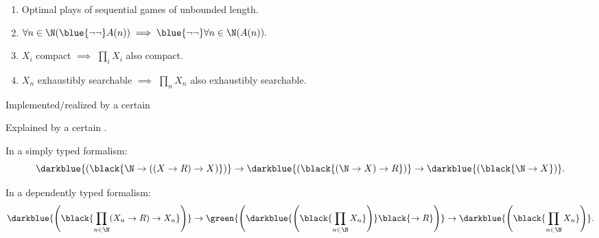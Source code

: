 \documentclass%
[%
Screen4to3,
]{foils}
\title{\darkblue{The ubiquitous selection monad}}
\author{\darkblue{Mart\'{\i}n Escard\'o} \\
University of Birmingham, UK\\[10ex]
Joint work with \darkblue{Paulo Oliva}, Queen Mary, London, UK. \\[9ex] ~}
\date{\sc Wessex Seminar, Swansea, 7th April 2011}
\begin{document}
\setlength{\parindent}{0in}

\maketitle


\begin{enumerate}
\item[\grey{1.}] 

Optimal plays of sequential games of unbounded length.

\item[\grey{2.}]   

$\forall n \in \N(\blue{\neg \neg} A(n)) \implies \blue{\neg \neg} \forall n \in \N(A(n)).$


\item[\grey{3.}]   

$X_i$ compact $\implies$ $\prod_i X_i$ also compact.  

\item[\grey{4.}]   

$X_n$ exhaustibly searchable $\implies$ $\prod_n X_n$ also exhaustibly searchable.  

\end{enumerate}


\vfill

Implemented/realized by a certain 

\vfill

Explained by a certain .

\vfill


\vfill

In a simply typed formalism:
\[
\darkblue{\left(\black{\N \to ((X \to R) \to X)}\right)} \to \darkblue{\left(\black{(\N \to X) \to R}\right)} \to \darkblue{\left(\black{\N \to X}\right)}.
\]

\vfill

In a dependently typed formalism: %
\[
\darkblue{\left(\black{\prod_{n  \in \N}(X_n \to R) \to X_n}\right)} \to
\green{\left(\darkblue{\left(\black{\prod_{n \in \N} X_n}\right)} \black{\to R}\right)} \to
\darkblue{\left(\black{\prod_{n \in \N} X_n}\right)}.
\]
\end{document}
